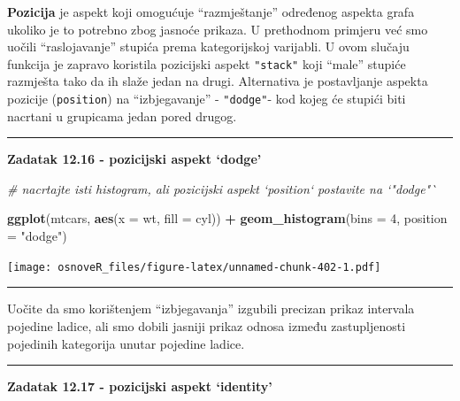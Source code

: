 \documentclass[]{book}
\newenvironment{Shaded}{\begin{snugshade}}{\end{snugshade}}
\newcommand{\KeywordTok}[1]{\textcolor[rgb]{0.13,0.29,0.53}{\textbf{#1}}}
\newcommand{\DataTypeTok}[1]{\textcolor[rgb]{0.13,0.29,0.53}{#1}}
\newcommand{\DecValTok}[1]{\textcolor[rgb]{0.00,0.00,0.81}{#1}}
\newcommand{\StringTok}[1]{\textcolor[rgb]{0.31,0.60,0.02}{#1}}
\newcommand{\CommentTok}[1]{\textcolor[rgb]{0.56,0.35,0.01}{\textit{#1}}}
\newcommand{\OperatorTok}[1]{\textcolor[rgb]{0.81,0.36,0.00}{\textbf{#1}}}
\newcommand{\NormalTok}[1]{#1}
\theoremstyle{definition}
\theoremstyle{definition}
\theoremstyle{definition}
\theoremstyle{remark}
\begin{document}
\textbf{Pozicija} je aspekt koji omogućuje ``razmještanje'' određenog
aspekta grafa ukoliko je to potrebno zbog jasnoće prikaza. U prethodnom
primjeru već smo uočili ``raslojavanje'' stupića prema kategorijskoj
varijabli. U ovom slučaju funkcija je zapravo koristila pozicijski
aspekt \texttt{"stack"} koji ``male'' stupiće razmješta tako da ih slaže
jedan na drugi. Alternativa je postavljanje aspekta pozicije
(\texttt{position}) na ``izbjegavanje'' - \texttt{"dodge"}- kod kojeg će
stupići biti nacrtani u grupicama jedan pored drugog.

\begin{center}\rule{0.5\linewidth}{\linethickness}\end{center}

\textbf{Zadatak 12.16 - pozicijski aspekt `dodge'}

\begin{Shaded}
\begin{Highlighting}[]
\CommentTok{# nacrtajte isti histogram, ali pozicijski aspekt `position` postavite na `"dodge"`}
\end{Highlighting}
\end{Shaded}

\begin{Shaded}
\begin{Highlighting}[]
\KeywordTok{ggplot}\NormalTok{(mtcars, }\KeywordTok{aes}\NormalTok{(}\DataTypeTok{x =}\NormalTok{ wt, }\DataTypeTok{fill =}\NormalTok{ cyl)) }\OperatorTok{+}\StringTok{ }\KeywordTok{geom_histogram}\NormalTok{(}\DataTypeTok{bins =} \DecValTok{4}\NormalTok{, }\DataTypeTok{position =} \StringTok{"dodge"}\NormalTok{)}
\end{Highlighting}
\end{Shaded}

\texttt{[image: osnoveR\_files/figure-latex/unnamed-chunk-402-1.pdf]}

\begin{center}\rule{0.5\linewidth}{\linethickness}\end{center}

Uočite da smo korištenjem ``izbjegavanja'' izgubili precizan prikaz
intervala pojedine ladice, ali smo dobili jasniji prikaz odnosa između
zastupljenosti pojedinih kategorija unutar pojedine ladice.

\begin{center}\rule{0.5\linewidth}{\linethickness}\end{center}

\textbf{Zadatak 12.17 - pozicijski aspekt `identity'}
\end{document}
